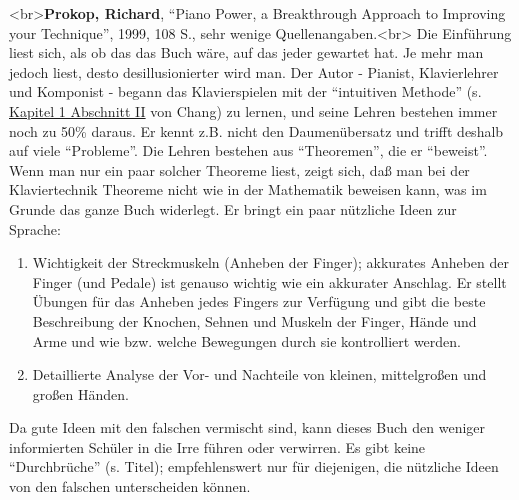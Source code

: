 \label{Prokop}

<br>\textbf{Prokop, Richard}, \enquote{Piano Power, a Breakthrough Approach to Improving your Technique}, 1999, 108 S., sehr wenige Quellenangaben.<br>
Die Einführung liest sich, als ob das das Buch wäre, auf das jeder gewartet hat.
Je mehr man jedoch liest, desto desillusionierter wird man.
Der Autor - Pianist, Klavierlehrer und Komponist - begann das Klavierspielen mit der \enquote{intuitiven Methode} (s. \hyperref[c1ii1]{Kapitel 1 Abschnitt II} von Chang) zu lernen, und seine Lehren bestehen immer noch zu 50\% daraus.
Er kennt z.B. nicht den Daumenübersatz und trifft deshalb auf viele \enquote{Probleme}.
Die Lehren bestehen aus \enquote{Theoremen}, die er \enquote{beweist}.
Wenn man nur ein paar solcher Theoreme liest, zeigt sich, daß man bei der Klaviertechnik Theoreme nicht wie in der Mathematik beweisen kann, was im Grunde das ganze Buch widerlegt.
Er bringt ein paar nützliche Ideen zur Sprache:

\begin{enumerate} 
 \item Wichtigkeit der Streckmuskeln (Anheben der Finger); akkurates Anheben der Finger (und Pedale) ist genauso wichtig wie ein akkurater Anschlag.
Er stellt Übungen für das Anheben jedes Fingers zur Verfügung und gibt die beste Beschreibung der Knochen, Sehnen und Muskeln der Finger, Hände und Arme und wie bzw. welche Bewegungen durch sie kontrolliert werden.
 \item Detaillierte Analyse der Vor- und Nachteile von kleinen, mittelgroßen und großen Händen.
\end{enumerate}
Da gute Ideen mit den falschen vermischt sind, kann dieses Buch den weniger informierten Schüler in die Irre führen oder verwirren.
Es gibt keine \enquote{Durchbrüche} (s. Titel); empfehlenswert nur für diejenigen, die nützliche Ideen von den falschen unterscheiden können.


\label{Richman}

